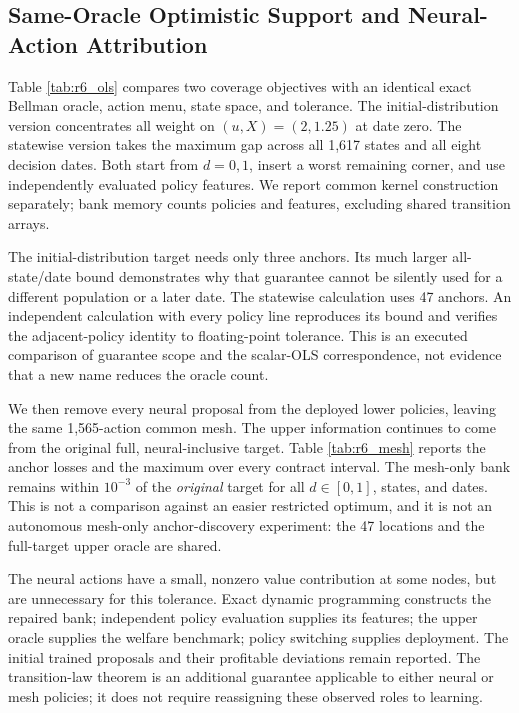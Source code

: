 \subsection{Same-Oracle Optimistic Support and Neural-Action Attribution}
\label{sec:r6_bank_evidence}
Table \ref{tab:r6_ols} compares two coverage objectives with an identical exact Bellman oracle, action menu, state space, and tolerance. The initial-distribution version concentrates all weight on $(u,X)=(2,1.25)$ at date zero. The statewise version takes the maximum gap across all 1,617 states and all eight decision dates. Both start from $d=0,1$, insert a worst remaining corner, and use independently evaluated policy features. We report common kernel construction separately; bank memory counts policies and features, excluding shared transition arrays.

The initial-distribution target needs only three anchors. Its much larger all-state/date bound demonstrates why that guarantee cannot be silently used for a different population or a later date. The statewise calculation uses 47 anchors. An independent calculation with every policy line reproduces its bound and verifies the adjacent-policy identity to floating-point tolerance. This is an executed comparison of guarantee scope and the scalar-OLS correspondence, not evidence that a new name reduces the oracle count.

We then remove every neural proposal from the deployed lower policies, leaving the same 1,565-action common mesh. The upper information continues to come from the original full, neural-inclusive target. Table \ref{tab:r6_mesh} reports the anchor losses and the maximum over every contract interval. The mesh-only bank remains within $10^{-3}$ of the \emph{original} target for all $d\in[0,1]$, states, and dates. This is not a comparison against an easier restricted optimum, and it is not an autonomous mesh-only anchor-discovery experiment: the 47 locations and the full-target upper oracle are shared.

The neural actions have a small, nonzero value contribution at some nodes, but are unnecessary for this tolerance. Exact dynamic programming constructs the repaired bank; independent policy evaluation supplies its features; the upper oracle supplies the welfare benchmark; policy switching supplies deployment. The initial trained proposals and their profitable deviations remain reported. The transition-law theorem is an additional guarantee applicable to either neural or mesh policies; it does not require reassigning these observed roles to learning.

